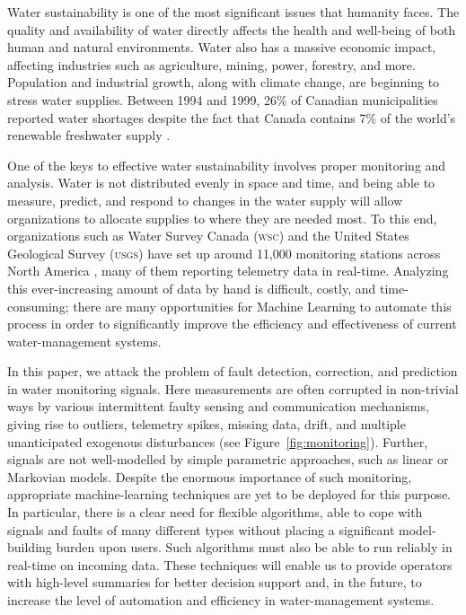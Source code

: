 \documentclass[letterpaper]{article}
\newcommand{\acro}[1]{\textsc{\MakeLowercase{#1}}}
\begin{document}
Water sustainability is one of the most significant issues that
humanity faces. The quality and availability of water
directly affects the health and well-being of both human and natural
environments. Water also has a massive economic impact, affecting
industries
such as agriculture, mining, power, forestry, and more. Population and
industrial growth, along with climate change, are beginning to stress
water supplies. Between 1994 and 1999, 26\% of Canadian municipalities
reported water shortages despite the fact that Canada
contains 7\% of the world's renewable freshwater supply \cite{atlas_canada}.

One of the keys to effective water sustainability involves proper
monitoring and analysis. Water is not distributed evenly in space
and time, and being able to measure, predict, and respond to changes
in the water supply will allow organizations to allocate supplies to
where they are needed most. To this end, organizations such as Water
Survey Canada (\acro{WSC}) and the United States Geological Survey
(\acro{USGS})
have set up around 11,000 monitoring stations across North America
\cite{wagner2006guidelines}, many of them reporting telemetry data in
real-time. Analyzing this ever-increasing amount of data by hand is
difficult, costly, and time-consuming; there are many opportunities
for Machine Learning
to automate this process in order to significantly improve the
efficiency and effectiveness of current water-management systems.

In this paper, we attack the problem of
fault detection, correction, and prediction in water monitoring
signals.  Here measurements are often corrupted in non-trivial ways by
various intermittent faulty sensing and communication mechanisms,
giving rise to outliers, telemetry spikes, missing data, drift, and
multiple unanticipated exogenous disturbances (see
Figure~\ref{fig:monitoring}).  Further, signals are not well-modelled
by simple parametric approaches, such as linear or Markovian
models. Despite the enormous importance of such monitoring,
appropriate machine-learning techniques are yet to be deployed for
this purpose. In particular, there is a clear need for flexible
algorithms, able to cope with signals and faults of many different
types without placing a significant model-building burden upon
users. Such algorithms must also be able to run reliably in real-time
on incoming data.
These techniques will enable us to provide operators with high-level
summaries for better decision support and, in the future, to increase
the level of automation and efficiency in water-management systems.
\end{document}
